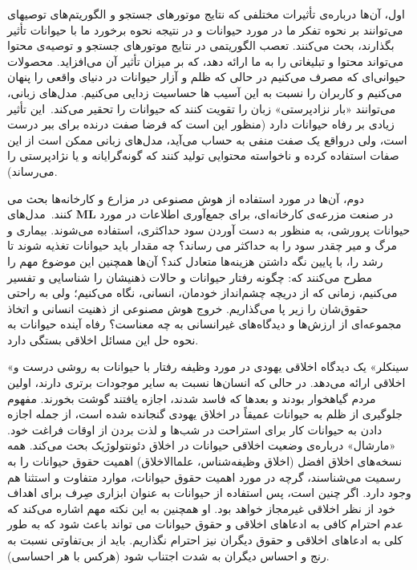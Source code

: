 اول، آن‌ها درباره‌ی تأثیرات مختلفی که نتایج موتورهای جستجو و الگوریتم‌های توصیهای می‌توانند بر نحوه تفکر ما در مورد حیوانات و در نتیجه نحوه برخورد ما با حیوانات تأثیر بگذارند، بحث می‌کنند.
تعصب الگوریتمی در نتایج موتورهای جستجو و توصیه‌ی محتوا می‌تواند محتوا و تبلیغاتی را به ما ارائه دهد، که بر میزان تأثیر آن می‌افزاید.
محصولات حیوانی‌ای که مصرف می‌کنیم در حالی که ظلم و آزار حیوانات در دنیای واقعی را پنهان می‌کنیم و کاربران را نسبت به این آسیب ها حساسیت زدایی می‌کنیم.
مدل‌های زبانی، می‌توانند «بار نزادپرستی» زبان را تقویت کنند که حیوانات را تحقیر می‌کند.\     این تأثیر زیادی بر رفاه حیوانات دارد (منظور این است که فرضا صفت درنده برای ببر درست است، ولی درواقع یک صفت منفی به حساب می‌آید، مدل‌های زبانی ممکن است از این صفات استفاده کرده و ناخواسته محتوایی تولید کنند که گونه‌گرایانه و یا نژادپرستی را می‌رساند).

دوم، آن‌ها در مورد استفاده از هوش مصنوعی در مزارع و کارخانه‌ها بحث می کنند.\     مدل‌های \textenglish{\textbf{ML}} در صنعت مزرعه‌ی کارخانه‌ای، برای جمع‌آوری اطلاعات در مورد حیوانات پرورشی، به منظور به دست آوردن سود حداکثری، استفاده می‌شوند.
بیماری و مرگ و میر چقدر سود را به حداکثر می رساند؟ چه مقدار باید حیوانات تغذیه شوند تا رشد را، با پایین نگه داشتن هزینه‌ها متعادل کند؟ آن‌ها همچنین این موضوع مهم را مطرح می‌کنند که: چگونه رفتار حیوانات و حالات ذهنیشان را شناسایی و تفسیر می‌کنیم، زمانی که از دریچه چشم‌انداز خودمان، انسانی، نگاه می‌کنیم؛ ولی به راحتی حقوق‌شان را زیر پا می‌گذاریم.
خروج هوش مصنوعی از ذهنیت انسانی و اتخاذ مجموعه‌ای از ارزش‌ها و دیدگاه‌های غیرانسانی به چه معناست؟ رفاه آینده حیوانات به نحوه حل این مسائل اخلاقی بستگی دارد.

«سینکلر» یک دیدگاه اخلاقی یهودی در مورد وظیفه رفتار با حیوانات به روشی درست و اخلاقی ارائه می‌دهد.
در حالی که انسان‌ها نسبت به سایر موجودات برتری دارند، اولین مردم گیاهخوار بودند و بعدها که فاسد شدند، اجازه یافتند گوشت بخورند.
مفهوم جلوگیری از ظلم به حیوانات عمیقاً در اخلاق یهودی گنجانده شده است، از جمله اجازه دادن به حیوانات کار برای استراحت در شب‌ها و لذت بردن از اوقات فراغت خود.
«مارشال» درباره‌ی وضعیت اخلاقی حیوانات در اخلاق دئونتولوژیک بحث می‌کند.
همه نسخه‌های اخلاق افضل (اخلاق وظیفه‌شناس، علماالاخلاق) اهمیت حقوق حیوانات را به رسمیت می‌شناسند، گرچه در مورد اهمیت حقوق حیوانات، موارد متفاوت و استثنا هم وجود دارد.
اگر چنین است، پس استفاده از حیوانات به عنوان ابزاری صِرف برای اهداف خود از نظر اخلاقی غیرمجاز خواهد بود.
او همچنین به این نکته مهم اشاره می‌کند که عدم احترام کافی به ادعاهای اخلاقی و حقوق حیوانات می تواند باعث شود که به طور کلی به ادعاهای اخلاقی و حقوق دیگران نیز احترام نگذاریم.
باید از بی‌تفاوتی نسبت به رنج و احساس دیگران به شدت اجتناب شود (هرکس با هر احساسی).

